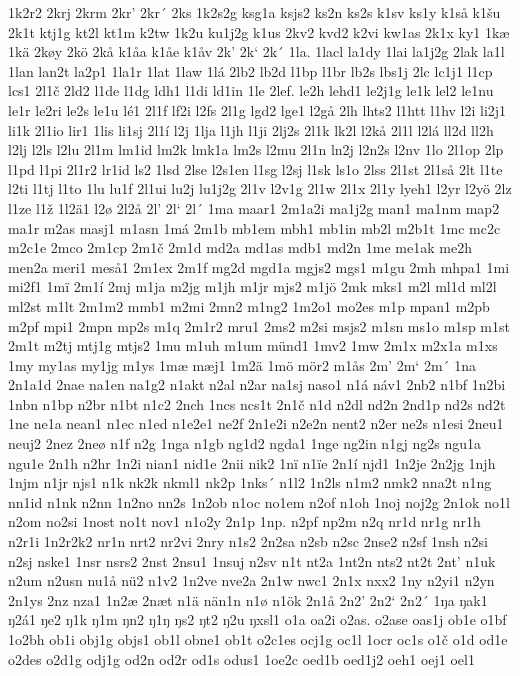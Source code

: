 1k2r2
2krj
2krm
2kr'
2kr´
2ks
1k2s2g
ksg1a
ksjs2
ks2n
ks2s
k1sv
ks1y
k1så
k1šu
2k1t
ktj1g
kt2l
kt1m
k2tw
1k2u
ku1j2g
k1us
2kv2
kvd2
k2vi
kw1as
2k1x
ky1
1kæ
1kä
2køy
2kö
2kå
k1åa
k1åe
k1åv
2k'
2k`
2k´
1la.
1lacl
la1dy
1lai
la1j2g
2lak
la1l
1lan
lan2t
la2p1
1la1r
1lat
1law
1lá
2lb2
lb2d
l1bp
l1br
lb2s
lbs1j
2lc
lc1j1
l1cp
lcs1
2l1č
2ld2
l1de
l1dg
ldh1
l1di
ld1in
1le
2lef.
le2h
lehd1
le2j1g
le1k
lel2
le1nu
le1r
le2ri
le2s
le1u
lé1
2l1f
lf2i
l2fs
2l1g
lgd2
lge1
l2gå
2lh
lhts2
l1htt
l1hv
l2i
li2j1
li1k
2l1io
lir1
1lis
li1sj
2l1í
l2j
1lja
l1jh
l1ji
2lj2s
2l1k
lk2l
l2kå
2l1l
l2lá
ll2d
ll2h
l2lj
l2ls
l2lu
2l1m
lm1id
lm2k
lmk1a
lm2s
l2mu
2l1n
ln2j
l2n2s
l2nv
1lo
2l1op
2lp
l1pd
l1pi
2l1r2
lr1id
ls2
1lsd
2lse
l2s1en
l1sg
l2sj
l1sk
ls1o
2lss
2l1st
2l1så
2lt
l1te
l2ti
l1tj
l1to
1lu
lu1f
2l1ui
lu2j
lu1j2g
2l1v
l2v1g
2l1w
2l1x
2l1y
lyeh1
l2yr
l2yö
2lz
l1ze
l1ž
1l2ä1
l2ø
2l2å
2l'
2l`
2l´
1ma
maar1
2m1a2i
ma1j2g
man1
ma1nm
map2
ma1r
m2as
masj1
m1asn
1má
2m1b
mb1em
mbh1
mb1in
mb2l
m2b1t
1mc
mc2c
m2c1e
2mco
2m1cp
2m1č
2m1d
md2a
md1as
mdb1
md2n
1me
me1ak
me2h
men2a
meri1
meså1
2m1ex
2m1f
mg2d
mgd1a
mgjs2
mgs1
m1gu
2mh
mhpa1
1mi
mi2f1
1mï
2m1í
2mj
m1ja
m2jg
m1jh
m1jr
mjs2
m1jö
2mk
mks1
m2l
ml1d
ml2l
ml2st
m1lt
2m1m2
mmb1
m2mi
2mn2
m1ng2
1m2o1
mo2es
m1p
mpan1
m2pb
m2pf
mpi1
2mpn
mp2s
m1q
2m1r2
mru1
2ms2
m2si
msjs2
m1sn
ms1o
m1sp
m1st
2m1t
m2tj
mtj1g
mtjs2
1mu
m1uh
m1um
münd1
1mv2
1mw
2m1x
m2x1a
m1xs
1my
my1as
my1jg
m1ys
1mæ
mæj1
1m2ä
1mö
mör2
m1ås
2m'
2m`
2m´
1na
2n1a1d
2nae
na1en
na1g2
n1akt
n2al
n2ar
na1sj
naso1
n1á
náv1
2nb2
n1bf
1n2bi
1nbn
n1bp
n2br
n1bt
n1c2
2nch
1ncs
ncs1t
2n1č
n1d
n2dl
nd2n
2nd1p
nd2s
nd2t
1ne
ne1a
nean1
n1ec
n1ed
n1e2e1
ne2f
2n1e2i
n2e2n
nent2
n2er
ne2s
n1esi
2neu1
neuj2
2nez
2neø
n1f
n2g
1nga
n1gb
ng1d2
ngda1
1nge
ng2in
n1gj
ng2s
ngu1a
ngu1e
2n1h
n2hr
1n2i
nian1
nid1e
2nii
nik2
1nï
n1ïe
2n1í
njd1
1n2je
2n2jg
1njh
1njm
n1jr
njs1
n1k
nk2k
nkml1
nk2p
1nks´
n1l2
1n2ls
n1m2
nmk2
nna2t
n1ng
nn1id
n1nk
n2nn
1n2no
nn2s
1n2ob
n1oc
no1em
n2of
n1oh
1noj
noj2g
2n1ok
no1l
n2om
no2si
1nost
no1t
nov1
n1o2y
2n1p
1np.
n2pf
np2m
n2q
nr1d
nr1g
nr1h
n2r1i
1n2r2k2
nr1n
nrt2
nr2vi
2nry
n1s2
2n2sa
n2sb
n2sc
2nse2
n2sf
1nsh
n2si
n2sj
nske1
1nsr
nsrs2
2nst
2nsu1
1nsuj
n2sv
n1t
nt2a
1nt2n
nts2
nt2t
2nt'
n1uk
n2um
n2usn
nu1å
nü2
n1v2
1n2ve
nve2a
2n1w
nwc1
2n1x
nxx2
1ny
n2yi1
n2yn
2n1ys
2nz
nza1
1n2æ
2næt
n1ä
nän1n
n1ø
n1ök
2n1å
2n2'
2n2`
2n2´
1ŋa
ŋak1
ŋ2á1
ŋe2
ŋ1k
ŋ1m
ŋn2
ŋ1ŋ
ŋs2
ŋt2
ŋ2u
ŋxsl1
o1a
oa2i
o2as.
o2ase
oas1j
ob1e
o1bf
1o2bh
ob1i
obj1g
objs1
ob1l
obne1
ob1t
o2c1es
ocj1g
oc1l
1ocr
oc1s
o1č
o1d
od1e
o2des
o2d1g
odj1g
od2n
od2r
od1s
odus1
1oe2c
oed1b
oed1j2
oeh1
oej1
oel1
